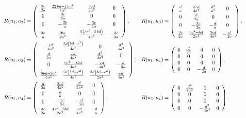 \documentclass{amsart}
\theoremstyle{plain}
\theoremstyle{remark}
\begin{document}
{{\begin{equation}
\begin{array}{ll}
R(u_1,u_2) =\left( \begin {array}{cccc} {\frac {3c}{2a}}&{\frac {22\,bd-15\,{c}^{2}}{4{a}^{2}}} &{\frac {3cd}{2{a}^{2}}}&0\\\noalign{\smallskip}0&{\frac {3c}{2a}}&0&0\\\noalign{\smallskip}0&-{\frac {3b}{a}}&-{\frac {3c}{2a}}&0\\\noalign{\smallskip}{\frac {3b}{a}}&{\frac {3bc}{2{a}^{2}}}&{\frac {5 \left(3{c}^{2}-2\,bd \right)}{4{a}^{2}}}&-{\frac {3c}{2a}}\end {array} \right), &R(u_1,u_3)=\left(\begin {array}{cccc} {\frac {d}{a}}&{\frac {5cd}{4{a}^{2}}}&{\frac {{d}^{2}}{{a}^{2}}}&0\\\noalign{\smallskip}0&{\frac {d}{2a}}&0&0\\\noalign{\smallskip}0&-{\frac {3c}{2a}}&-{\frac {d}{a}}&0\\\noalign{\smallskip}{\frac {3c}{2a}}&{\frac {3{c}^{2}-bd}{2{a}^{2}}}&{\frac {3cd}{4{a}^{2}}}&-{\frac {d}{2a}}\end {array} \right), \vspace{2mm}\\
R(u_2,u_3)=\left( \begin {array}{cccc} -{\frac {cd}{4{a}^{2}}}&\frac {3d\left( bd-c^2 \right) }{4{a}^{3}}&0&{\frac {{d}^{2}}{4{a}^{2}}}\\\noalign{\smallskip}{\frac {d}{2a}}&{\frac {cd}{4{a}^{2}}}&{\frac {{d}^{2}}{4{a}^{2}}}&0\\\noalign{\smallskip}0&{\frac {9c^2 -10bd}{4{a}^{2}}}&-{\frac {cd}{4{a}^{2}}}&-{\frac {d}{2a}}\\\noalign{\smallskip} {\frac {8bd -9 c^2}{4{a}^{2}}}&{\frac {9c \left(bd-c^2\right)}{4{a}^{3}}}&{\frac {3d\left( b{d} -c^{2}\right)}{2{a}^{3}}} & {\frac {cd}{4{a}^{2}}}\end {array} \right), & R(u_1,u_4)=\left( \begin {array}{cccc} 0&{\frac {d}{2a}}&0&0\\ 0&0&0&0\\0&0&0&0\\0&0&-{\frac {d}{2a}}&0\end {array} \right),  
\vspace{2mm}\\
R(u_2,u_4)=\left( \begin {array}{cccc} {\frac {d}{2a}}&{\frac {3cd}{4{a}^{2}}}&{\frac {{d}^{2}}{2{a}^{2}}}&0\\ \noalign{\smallskip}0&{\frac {d}{a}}&0&0\\ \noalign{\smallskip}0&-{\frac {3c}{2a}}&-{\frac {d}{2a}}&0\\\noalign{\smallskip} {\frac {3c}{2a}}&{\frac {3\,{c}^{2}-2bd}{2{a}^{2}}}& \frac{cd}{4a^2}&-{\frac {d}{a}}\end {array} \right), & R(u_3,u_4)=\left( \begin {array}{cccc} 0&{\frac {{d}^{2}}{4{a}^{2}}}&0&0\\0&0&0&0\\0&0&0&0\\0&0&-{\frac {{d}^{2}}{4{a}^{2}}}&0\end {array} \right). 

\end{array}
\end{equation}}}
\end{document}
